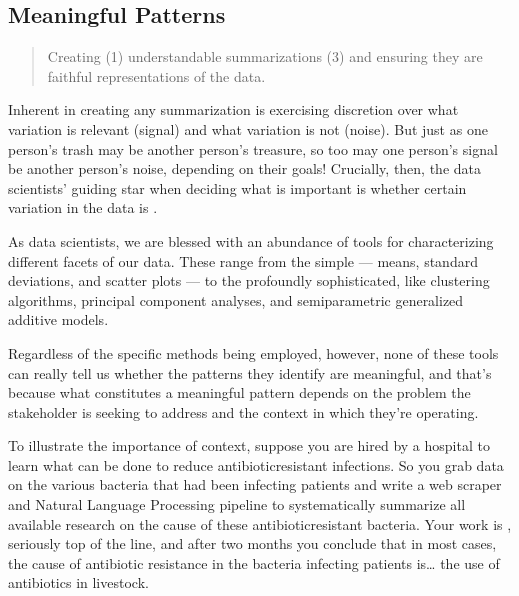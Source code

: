 \documentclass[letterpaper,10pt,english]{jupyterBook}
\begin{document}
\subsection{Meaningful Patterns}
\label{\detokenize{30_questions/15_answering_exploratory_questions:meaningful-patterns}}\begin{quote}

\sphinxAtStartPar
Creating (1) understandable summarizations  (3) and ensuring they are faithful representations of the data.
\end{quote}

\sphinxAtStartPar
Inherent in creating any summarization is exercising discretion over what variation is relevant (signal) and what variation is not (noise). But just as one person’s trash may be another person’s treasure, so too may one person’s signal be another person’s noise, depending on their goals! Crucially, then, the data scientists’ guiding star when deciding what is important is whether certain variation in the data is .

\sphinxAtStartPar
As data scientists, we are blessed with an abundance of tools for characterizing different facets of our data. These range from the simple — means, standard deviations, and scatter plots — to the profoundly sophisticated, like clustering algorithms, principal component analyses, and semi\sphinxhyphen{}parametric generalized additive models.

\sphinxAtStartPar
Regardless of the specific methods being employed, however, none of these tools can really tell us whether the patterns they identify are meaningful, and that’s because what constitutes a meaningful pattern depends on the problem the stakeholder is seeking to address and the context in which they’re operating.

\sphinxAtStartPar
To illustrate the importance of context, suppose you are hired by a hospital to learn what can be done to reduce antibiotic\sphinxhyphen{}resistant infections. So you grab data on the various bacteria that had been infecting patients and write a web scraper and Natural Language Processing pipeline to systematically summarize all available research on the cause of these antibiotic\sphinxhyphen{}resistant bacteria. Your work is , seriously top of the line, and after two months you conclude that in most cases, the cause of antibiotic resistance in the bacteria infecting patients is… the use of antibiotics in livestock.
\end{document}
